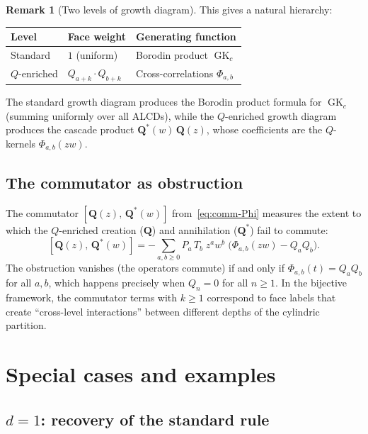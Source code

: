 \documentclass[11pt]{article}
\newcommand{\GK}{\operatorname{GK}}
\theoremstyle{plain}
\theoremstyle{definition}
\newtheorem{remark}[theorem]{Remark}
\begin{document}
\begin{remark}[Two levels of growth diagram]
\label{rem:two-levels}
This gives a natural hierarchy:
\begin{center}
\begin{tabular}{lll}
\textbf{Level} & \textbf{Face weight} &
  \textbf{Generating function} \\[2pt]
\hline
Standard & $1$ (uniform) &
  Borodin product $\GK_c$ \\[3pt]
$Q$-enriched & $Q_{a+k} \cdot Q_{b+k}$ &
  Cross-correlations $\Phi_{a,b}$
\end{tabular}
\end{center}
The standard growth diagram produces the Borodin product formula
for $\GK_c$ (summing uniformly over all ALCDs), while the
$Q$-enriched growth diagram produces the cascade product
$\mathbf{Q}^*(w)\, \mathbf{Q}(z)$, whose coefficients are the
$Q$-kernels $\Phi_{a,b}(zw)$.
\end{remark}

\subsection{The commutator as obstruction}

The commutator $[\mathbf{Q}(z),\, \mathbf{Q}^*(w)]$
from~\eqref{eq:comm-Phi} measures the extent to which the
$Q$-enriched creation ($\mathbf{Q}$) and annihilation
($\mathbf{Q}^*$) fail to commute:
\begin{equation}\label{eq:comm-obstruction}
  [\mathbf{Q}(z),\, \mathbf{Q}^*(w)]
  = -\sum_{a,b \geq 0} P_a\, T_b\; z^a w^b\;
    \bigl(\Phi_{a,b}(zw) - Q_a Q_b\bigr).
\end{equation}
The obstruction vanishes (the operators commute) if and only if
$\Phi_{a,b}(t) = Q_a Q_b$ for all $a, b$, which happens precisely
when $Q_n = 0$ for all $n \geq 1$.  In the bijective framework,
the commutator terms with $k \geq 1$ correspond to face labels
that create ``cross-level interactions'' between different depths
of the cylindric partition.


\section{Special cases and examples}
\label{sec:special-cases}


\subsection{$d = 1$: recovery of the standard rule}
\end{document}
